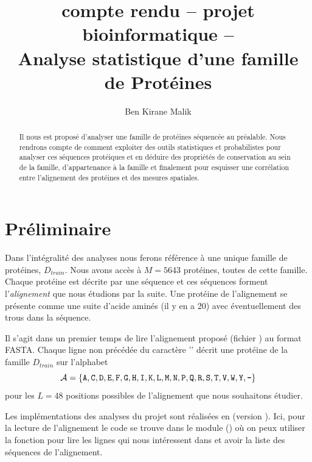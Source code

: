 \documentclass[a4paper, french]{article}
\title{compte rendu -- projet bioinformatique --\\%
Analyse statistique d'une famille de Prot\'eines}
\author{Ben Kirane Malik}
\begin{document}
\maketitle
\setlength{\parskip}{0.1in}
\setlength{\parindent}{15pt}
\begin{abstract}
    Il nous est proposé d'analyser une famille de prot\'eines
    s\'equenc\'ee au pr\'ealable. Nous rendrons compte de comment
    exploiter des outils statistiques et probabilistes pour
    analyser ces séquences protéiques et en d\'eduire des propri\'et\'es
    de conservation au sein de la famille, d'appartenance \`a la famille
    et finalement pour esquisser une corr\'elation entre
    l'alignement des prot\'eines et des mesures spatiales.
\end{abstract}

\section{Pr\'eliminaire}

Dans l'int\'egralit\'e des analyses nous ferons r\'ef\'erence \`a une
unique famille de prot\'eines, $D_{train}$.
Nous avons acc\`es \`a $M=5643$ prot\'eines, toutes de cette famille.
%
Chaque prot\'eine est d\'ecrite par une s\'equence et
ces s\'equences forment l'\emph{alignement}
que nous \'etudions par la suite.  Une prot\'eine de l'alignement se
pr\'esente comme une suite d'acide amin\'es (il y en a 20)
avec \'eventuellement des trous dans la s\'equence.
%
%

Il s'agit dans un premier temps de lire l'alignement propos\'e
(fichier ) au format FASTA.
Chaque ligne non pr\'ec\'ed\'ee du caract\`ere '\cword{>}'
d\'ecrit une prot\'eine de la famille $D_{train}$ sur l'alphabet
\begin{equation*}
    \mathcal{A}=\{\cword{A},\cword{C},\cword{D},\cword{E},\cword{F},\cword{G},
    \cword{H},\cword{I},\cword{K},\cword{L},\cword{M},\cword{N},\cword{P},
\cword{Q},\cword{R},\cword{S},\cword{T},\cword{V},\cword{W},\cword{Y},\cword{-}\}
\end{equation*}
pour les $L=48$ positions possibles de l'alignement que nous souhaitons \'etudier.

Les impl\'ementations des analyses du projet sont r\'ealis\'ees en
 (version ). 
Ici, pour la lecture de l'alignement le code se trouve
dans le module  () o\`u on peux utiliser
la fonction  pour lire les lignes qui nous
int\'eressent dans  et avoir la liste des s\'equences
de l'alignement.
\end{document}
